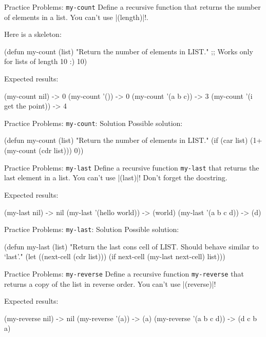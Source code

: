 \documentclass{beamer}
\begin{document}

\begin{frame}[fragile]{Practice Problems: \texttt{my-count}}
  Define a recursive function that returns the number of elements in a list. You can't use \cl|(length)|!.

Here is a skeleton:
\begin{clcode}
(defun my-count (list)
  "Return the number of elements in LIST."
  ;; Works only for lists of length 10 :)
  10)
\end{clcode}

Expected results:
\begin{clcode}
(my-count nil) -> 0
(my-count '()) -> 0
(my-count '(a b c)) -> 3
(my-count '(i get the point)) -> 4
\end{clcode}
\end{frame}

\begin{frame}[fragile]{Practice Problems: \texttt{my-count}: Solution}
Possible solution:
\begin{clcode}
(defun my-count (list)
  "Return the number of elements in LIST."
  (if (car list)
      (1+ (my-count (cdr list)))
    0))
  \end{clcode}
\end{frame}

\begin{frame}[fragile]{Practice Problems: \texttt{my-last}}
Define a recursive function \texttt{my-last} that returns the last element in a list. You can't use \cl|(last)|! Don't forget the docstring.

Expected results:
\begin{clcode}
(my-last nil) -> nil
(my-last '(hello world)) -> (world)
(my-last '(a b c d)) -> (d)
\end{clcode}
\end{frame}

\begin{frame}[fragile]{Practice Problems: \texttt{my-last}: Solution}
  Possible solution:
  \begin{clcode}
(defun my-last (list)
  "Return the last cons cell of LIST.
Should behave similar to `last'."
  (let ((next-cell (cdr list)))
    (if next-cell
        (my-last next-cell)
      list)))
  \end{clcode}
\end{frame}

\begin{frame}[fragile]{Practice Problems: \texttt{my-reverse}}
  Define a recursive function \texttt{my-reverse} that returns a copy
  of the list in reverse order. You can't use \cl|(reverse)|!

Expected results:
\begin{clcode}
(my-reverse nil) -> nil
(my-reverse '(a)) -> (a)
(my-reverse '(a b c d)) -> (d c b a)
\end{clcode}
\end{frame}
\end{document}
